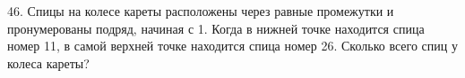 46. Спицы на колесе кареты расположены через равные промежутки и пронумерованы подряд, начиная с 1. Когда в нижней точке находится спица номер 11, в самой верхней точке находится спица номер 26. Сколько всего спиц у колеса кареты?\\
